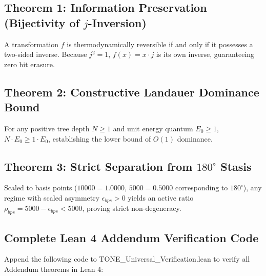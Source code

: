 \documentclass[11pt,a4paper,oneside]{article}
\def\text#1{#1}%
\def\texttt#1{#1}%
\theoremstyle{definition}
\begin{document}
\subsection{Theorem 1: Information Preservation (Bijectivity of $j$-Inversion)}
A transformation $f$ is thermodynamically reversible if and only if it possesses a two-sided inverse. Because $j^2 = 1$, $f(x) = x \cdot j$ is its own inverse, guaranteeing zero bit erasure.

\subsection{Theorem 2: Constructive Landauer Dominance Bound}
For any positive tree depth $N \ge 1$ and unit energy quantum $E_0 \ge 1$, $N \cdot E_0 \ge 1 \cdot E_0$, establishing the lower bound of $O(1)$ dominance.

\subsection{Theorem 3: Strict Separation from $180^\circ$ Stasis}
Scaled to basis points ($10000 = 1.0000$, $5000 = 0.5000$ corresponding to $180^\circ$), any regime with scaled asymmetry $\epsilon_{\text{bps}} > 0$ yields an active ratio $\rho_{\text{bps}} = 5000 - \epsilon_{\text{bps}} < 5000$, proving strict non-degeneracy.

\subsection{Complete Lean 4 Addendum Verification Code}
Append the following code to \texttt{TONE\_Universal\_Verification.lean} to verify all Addendum theorems in Lean 4:
\end{document}
